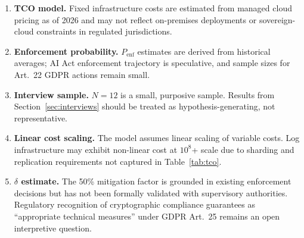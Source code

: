 \begin{enumerate}
  \item \textbf{TCO model.} Fixed infrastructure costs are estimated
  from managed cloud pricing as of 2026 and may not reflect
  on-premises deployments or sovereign-cloud constraints in regulated
  jurisdictions.

  \item \textbf{Enforcement probability.} $P_{\text{enf}}$ estimates
  are derived from historical averages; AI Act enforcement trajectory
  is speculative, and sample sizes for Art.~22 GDPR actions remain
  small.

  \item \textbf{Interview sample.} $N=12$ is a small, purposive sample.
  Results from Section~\ref{sec:interviews} should be treated as
  hypothesis-generating, not representative.

  \item \textbf{Linear cost scaling.} The model assumes linear scaling
  of variable costs. Log infrastructure may exhibit non-linear cost at
  $10^8$+ scale due to sharding and replication requirements not
  captured in Table~\ref{tab:tco}.

  \item \textbf{$\delta$ estimate.} The 50\% mitigation factor is
  grounded in existing enforcement decisions but has not been formally
  validated with supervisory authorities. Regulatory recognition of
  cryptographic compliance guarantees as ``appropriate technical
  measures'' under GDPR Art.~25 remains an open interpretive question.
\end{enumerate}
